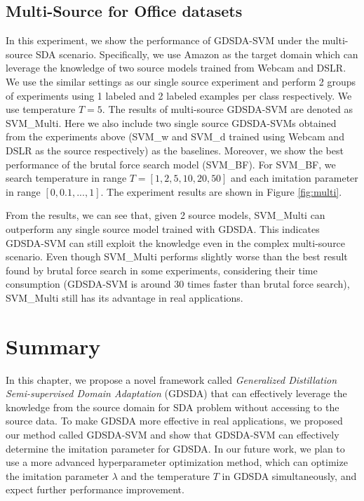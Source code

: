 \subsection{Multi-Source for Office datasets}
In this experiment, we show the performance of GDSDA-SVM under the multi-source SDA scenario.
Specifically, we use Amazon as the target domain which can leverage the knowledge of two source models trained from Webcam and DSLR.
We use the similar settings as our single source experiment and perform 2 groups of experiments using 1 labeled and 2 labeled examples per class respectively. We use temperature $T=5$. The results of multi-source GDSDA-SVM are denoted as SVM\_Multi. Here we also include two single source GDSDA-SVMs obtained from the experiments above (SVM\_w and SVM\_d trained using Webcam and DSLR as the source respectively) as the baselines. Moreover, we show the best performance of the brutal force search model (SVM\_BF). For SVM\_BF, we search temperature in range $T=[1,2,5,10,20,50]$ and each imitation parameter in range $[0,0.1,...,1]$. The experiment results are shown in Figure \ref{fig:multi}.

From the results, we can see that, given 2 source models, SVM\_Multi can outperform any single source model trained with GDSDA. This indicates GDSDA-SVM can still exploit the knowledge even in the complex multi-source scenario. Even though SVM\_Multi performs slightly worse than the best result found by brutal force search in some experiments, considering their time consumption (GDSDA-SVM is around 30 times faster than brutal force search), SVM\_Multi still has its advantage in real applications.

\section{Summary}\label{sec:aaai:con}
In this chapter, we propose a novel framework called \textit{Generalized Distillation Semi-supervised Domain Adaptation} (GDSDA) that can effectively leverage the knowledge from the source domain for SDA problem without accessing to the source data. 
To make GDSDA more effective in real applications, we proposed our method called GDSDA-SVM and show that GDSDA-SVM can effectively determine the imitation parameter for GDSDA. 
In our future work, we plan to use a more advanced hyperparameter optimization method, which can optimize the imitation parameter $\lambda$ and the temperature $T$ in GDSDA simultaneously, and expect
further performance improvement. 